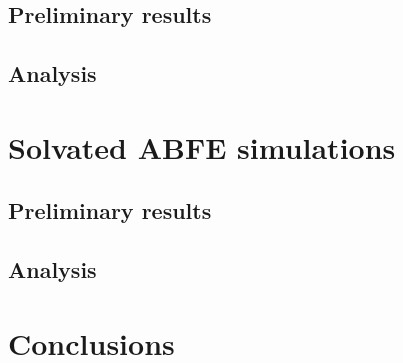 \subsection{Preliminary results}

\lipsum[1][1-3]

\subsection{Analysis}

\lipsum[1][1-3]

\section{Solvated ABFE simulations}

\lipsum[1][1-3]

\subsection{Preliminary results}

\lipsum[1][1-3]

\subsection{Analysis}

\lipsum[1][1-3]

\section{Conclusions}
\lipsum[1][1-3]
